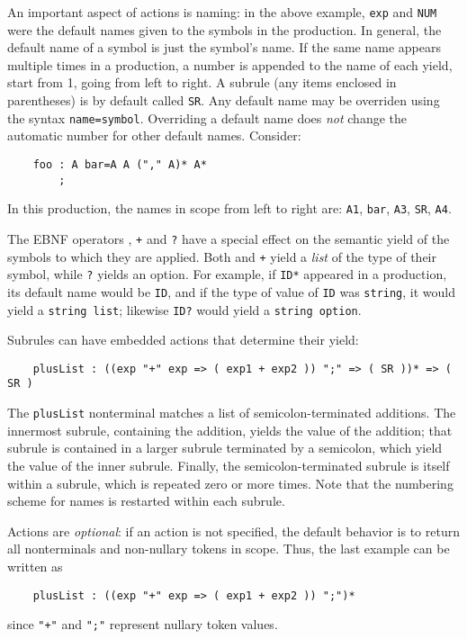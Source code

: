 An important aspect of actions is naming: in the above example, {\tt exp} and {\tt NUM} were the default names given to the symbols in the production.  In general, the default name of a symbol is just the symbol's name.  If the same name appears multiple times in a production, a number is appended to the name of each yield, start from 1, going from left to right.  A subrule (any items enclosed in parentheses) is by default called {\tt SR}.  Any default name may be overriden using the syntax {\tt name=symbol}.  Overriding a default name does \emph{not} change the automatic number for other default names.  Consider:
\begin{verbatim}
    foo : A bar=A A ("," A)* A*
        ;
\end{verbatim}
In this production, the names in scope from left to right are: {\tt A1}, {\tt bar}, {\tt A3}, {\tt SR}, {\tt A4}.

The EBNF operators {\tt *}, {\tt +} and {\tt ?} have a special effect on the semantic yield of the symbols to which they are applied.  Both {\tt *} and {\tt +} yield a \emph{list} of the type of their symbol, while {\tt ?} yields an option.  For example, if {\tt ID*} appeared in a production, its default name would be {\tt ID}, and if the type of value of {\tt ID} was {\tt string}, it would yield a {\tt string list}; likewise {\tt ID?} would yield a {\tt string option}.  

Subrules can have embedded actions that determine their yield:
\begin{verbatim}
    plusList : ((exp "+" exp => ( exp1 + exp2 )) ";" => ( SR ))* => ( SR )
\end{verbatim}
The {\tt plusList} nonterminal matches a list of semicolon-terminated additions.  The innermost subrule, containing the addition, yields the value of the addition; that subrule is contained in a larger subrule terminated by a semicolon, which yield the value of the inner subrule.  Finally, the semicolon-terminated subrule is itself within a subrule, which is repeated zero or more times.  Note that the numbering scheme for names is restarted within each subrule.

Actions are \emph{optional}: if an action is not specified, the default behavior is to return all nonterminals and non-nullary tokens in scope.  Thus, the last example can be written as 
\begin{verbatim}
    plusList : ((exp "+" exp => ( exp1 + exp2 )) ";")*
\end{verbatim}
since {\tt "+"} and {\tt ";"} represent nullary token values.


